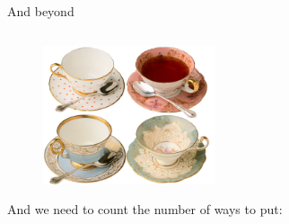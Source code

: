 \documentclass[9pt,aspectratio=169]{beamer}
\begin{document}
\begin{frame}{And beyond}
\begin{columns}[T]
\begin{column}{0.5\textwidth}
\begin{problem}
        \begin{figure}%
          \vspace*{2em}
          \includegraphics[width=0.45\textwidth]{02 - Combinatorics 101/cups.png}
        \end{figure}

        And we need to count the number of ways to put:


\end{problem}
\end{column}
\end{columns}
\end{frame}
\end{document}
